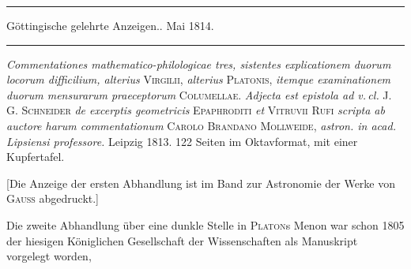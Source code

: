 \begin{center}
\rule{.85\textwidth}{.3pt}\par
Göttingische gelehrte Anzeigen.. Mai 1814.\par
\rule{.85\textwidth}{.3pt}
\end{center}
\hspace*{\parindent}\textit{Commentationes mathematico-philologicae tres, sistentes explicationem duorum locorum difficilium, alterius} \textsc{Virgilii}, \textit{alterius} \textsc{Platonis}, \textit{itemque examinationem duorum mensurarum praeceptorum} \textsc{Columellae}. \textit{Adjecta est epistola ad v.\,cl.} J. G. \textsc{Schneider} \textit{de excerptis geometricis} \textsc{Epaphroditi} \textit{et} \textsc{Vitruvii Rufi} \textit{scripta ab auctore harum commentationum} \textsc{Carolo Brandano Mollweide}, \textit{astron. in acad. Lipsiensi professore.} Leipzig 1813. 122 Seiten im Oktavformat, mit einer Kupfertafel.

[Die Anzeige der ersten Abhandlung ist im Band zur Astronomie der Werke von \textsc{Gauss} abgedruckt.]

Die zweite Abhandlung über eine dunkle Stelle in \textsc{Platon}s Menon war schon 1805 der hiesigen Königlichen Gesellschaft der Wissenschaften als Manuskript vorgelegt worden, %
